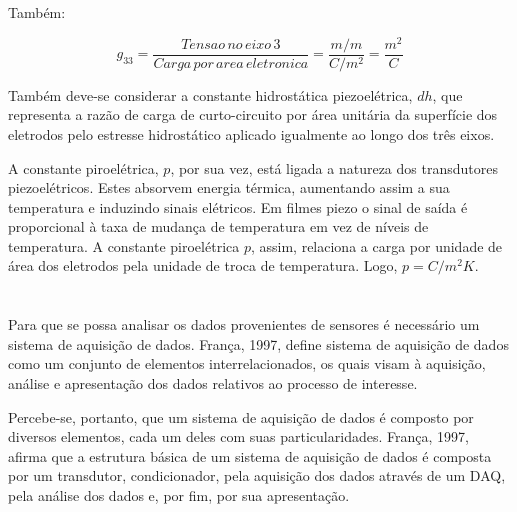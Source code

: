 \documentclass[
	12pt,				
	oneside,			
	a4paper,			
	english,			
	brazil,	
	sumario=abnt-6027-2012		
	]{abntex2ppgsi}
\begin{document}
Também:

\begin{equation}
	g_{33} = \frac{Tensao \,no \,eixo \,3}{Carga \,por \,area \,eletronica} = \frac{m/m}{C/m^{2}} = \frac{m^{2}}{C}
	\label{eq: Contante G, expressando a tensão ao longo de um eixo específico pela carga elétrica por área unitária de eletrodos.}
\end{equation}

Também deve-se considerar a constante hidrostática piezoelétrica, $dh$, que representa a razão de carga de curto-circuito por área unitária da superfície dos eletrodos pelo estresse hidrostático aplicado igualmente ao longo dos três eixos. 

A constante piroelétrica, $p$, por sua vez, está ligada a natureza dos transdutores piezoelétricos. Estes absorvem energia térmica, aumentando assim a sua temperatura e induzindo sinais elétricos. Em filmes piezo o sinal de saída é proporcional à taxa de mudança de temperatura em vez de níveis de temperatura. A constante piroelétrica $p$, assim, relaciona a carga por unidade de área dos eletrodos pela unidade de troca de temperatura. Logo, $p = C/m^{2} K$.

\newpage
\section{}

Para que se possa analisar os dados provenientes de sensores é necessário um sistema de aquisição de dados. França, 1997, define sistema de aquisição de dados como um conjunto de elementos interrelacionados, os quais visam à aquisição, análise e apresentação dos dados relativos ao processo de interesse.

Percebe-se, portanto, que um sistema de aquisição de dados é composto por diversos elementos, cada um deles com suas particularidades. França, 1997, afirma que a estrutura básica de um sistema de aquisição de dados é composta por um transdutor, condicionador, pela aquisição dos dados através de um DAQ, pela análise dos dados e, por fim, por sua apresentação. 


\subsection{}
\label{sub:condicionamento}
\end{document}
